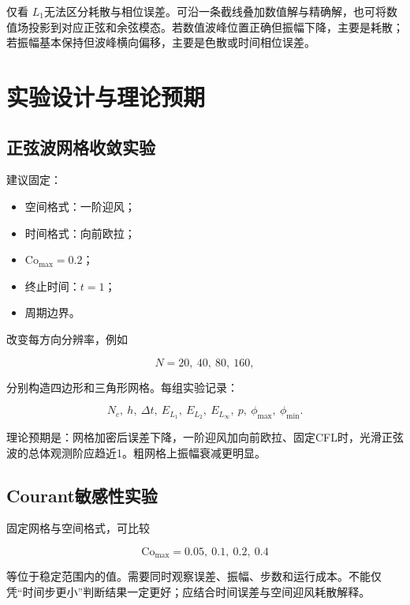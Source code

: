 \documentclass[UTF8,12pt,a4paper,fontset=fandol]{ctexart}
\numberwithin{equation}{section}
\newcommand{\Cmax}{\mathrm{Co}_{\max}}
\begin{document}
仅看 $L_1$无法区分耗散与相位误差。可沿一条截线叠加数值解与精确解，也可将数值场投影到对应正弦和余弦模态。若数值波峰位置正确但振幅下降，主要是耗散；若振幅基本保持但波峰横向偏移，主要是色散或时间相位误差。

\section{实验设计与理论预期}

\subsection{正弦波网格收敛实验}

建议固定：

\begin{itemize}
  \item 空间格式：一阶迎风；
  \item 时间格式：向前欧拉；
  \item $\Cmax=0.2$；
  \item 终止时间：$t=1$；
  \item 周期边界。
\end{itemize}

改变每方向分辨率，例如

\begin{equation}
  N=20,\ 40,\ 80,\ 160,
\end{equation}

分别构造四边形和三角形网格。每组实验记录：

\begin{equation}
  N_c,\ h,\ \Delta t,\ E_{L_1},\ E_{L_2},\
  E_{L_\infty},\ p,\ \phi_{\max},\ \phi_{\min}.
\end{equation}

理论预期是：网格加密后误差下降，一阶迎风加向前欧拉、固定CFL时，光滑正弦波的总体观测阶应趋近1。粗网格上振幅衰减更明显。

\subsection{Courant敏感性实验}

固定网格与空间格式，可比较

\begin{equation}
  \Cmax=0.05,\ 0.1,\ 0.2,\ 0.4
\end{equation}

等位于稳定范围内的值。需要同时观察误差、振幅、步数和运行成本。不能仅凭“时间步更小”判断结果一定更好；应结合时间误差与空间迎风耗散解释。
\end{document}
